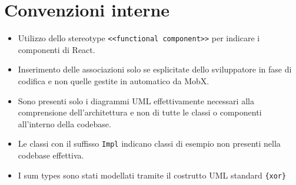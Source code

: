 \section{Convenzioni interne}
\begin{itemize}
    \item Utilizzo dello stereotype \texttt{<<functional component>>} per indicare i componenti di React.
    \item Inserimento delle associazioni solo se esplicitate dello sviluppatore in fase di codifica e non quelle gestite in automatico da MobX.
    \item Sono presenti solo i diagrammi UML effettivamente necessari alla comprensione dell'architettura e non di tutte le classi o componenti all'interno della codebase.
    \item Le classi con il suffisso \texttt{Impl} indicano classi di esempio non presenti nella codebase effettiva.
    \item I sum types sono stati modellati tramite il costrutto UML standard \texttt{\{xor\}}
\end{itemize}
